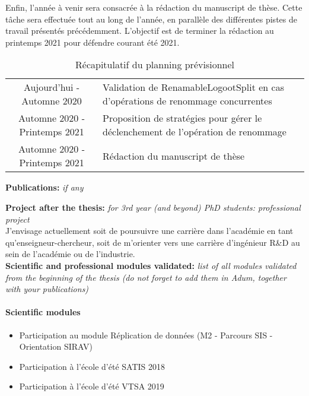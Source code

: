 \documentclass[12pt]{article}
\newcommand{\commentaire}[1]{\small\textit{#1}}
\begin{document}
Enfin, l'année à venir sera consacrée à la rédaction du manuscript de thèse.
Cette tâche sera effectuée tout au long de l'année, en parallèle des différentes pistes de travail présentés précédemment.
L'objectif est de terminer la rédaction au printemps 2021 pour défendre courant été 2021.
\\

\begin{table}
  \small
  \begin{tabular} {c | p{11cm}}
    Aujourd'hui - Automne 2020 & Validation de RenamableLogootSplit en cas d'opérations de renommage concurrentes \\
    Automne 2020 - Printemps 2021 & Proposition de stratégies pour gérer le déclenchement de l'opération de renommage \\
    Automne 2020 - Printemps 2021 & Rédaction du manuscript de thèse
  \end{tabular}
  \caption{Récapitulatif du planning prévisionnel}
\end{table}

\noindent\textbf{Publications:}
\commentaire{%
  if any\\}


\nocite{*}

\noindent\textbf{Project after the thesis:}
\commentaire{%
  for 3rd year (and beyond) PhD students: professional project\\}
J'envisage actuellement soit de poursuivre une carrière dans l'académie en tant qu'enseigneur-chercheur, soit de m'orienter vers une carrière d'ingénieur R\&D au sein de l'académie ou de l'industrie.
\\

\noindent\textbf{Scientific and professional modules validated:}
\commentaire{%
  list of all modules validated from the beginning of the thesis (do
  not forget to add them in Adum, together with your publications)}
\paragraph{\footnotesize Scientific modules}
  \begin{itemize}
      \itemsep0em
      \item Participation au module Réplication de données (M2 - Parcours SIS - Orientation SIRAV)
      \item Participation à l'école d'été SATIS 2018
      \item Participation à l'école d'été VTSA 2019
  \end{itemize}
\end{document}
